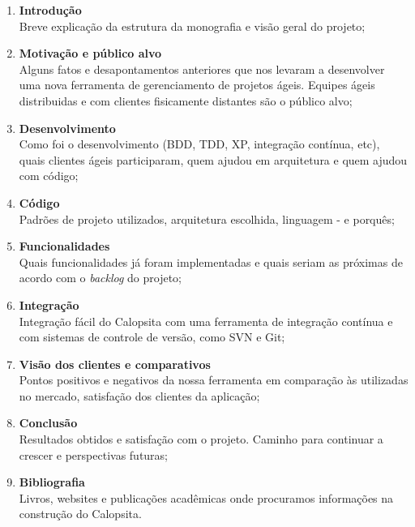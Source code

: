 \documentclass[titlepage]{article}
\begin{document}
\begin{enumerate}
	\item{\textbf{Introdução} \\ Breve explicação da estrutura da monografia e visão geral do projeto;}
	\item{\textbf{Motivação e público alvo} \\ Alguns fatos e desapontamentos anteriores que nos levaram a desenvolver uma nova ferramenta de gerenciamento de projetos ágeis. Equipes ágeis distribuidas e com clientes fisicamente distantes são o público alvo;}
	\item{\textbf{Desenvolvimento} \\ Como foi o desenvolvimento (BDD, TDD, XP, integração contínua, etc), quais clientes ágeis participaram, quem ajudou em arquitetura e quem ajudou com código;}
	\item{\textbf{Código} \\ Padrões de projeto utilizados, arquitetura escolhida, linguagem - e porquês;}
	\item{\textbf{Funcionalidades} \\ Quais funcionalidades já foram implementadas e quais seriam as próximas de acordo com o \textit{backlog} do projeto;}
	\item{\textbf{Integração} \\ Integração fácil do Calopsita com uma ferramenta de integração contínua e com sistemas de controle de versão, como SVN e Git;}
	\item{\textbf{Visão dos clientes e comparativos} \\ Pontos positivos e negativos da nossa ferramenta em comparação às utilizadas no mercado, satisfação dos clientes da aplicação;}
	\item{\textbf{Conclusão} \\ Resultados obtidos e satisfação com o projeto. Caminho para continuar a crescer e perspectivas futuras;}
	\item{\textbf{Bibliografia} \\ Livros, websites e publicações acadêmicas onde procuramos informações na construção do Calopsita.}
\end{enumerate}
\end{document}
